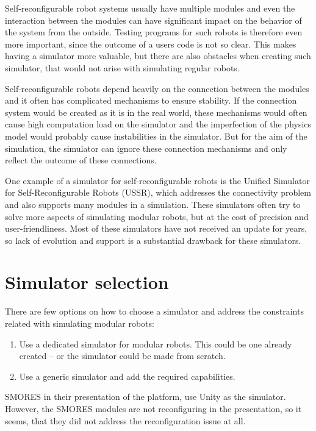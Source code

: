 \documentclass[
  digital, %
  table,   %
  oneside, %
  nolof,     %
  nolot,     %
]{fithesis3}
\begin{document}
Self-reconfigurable robot systems usually have multiple modules and even the interaction between the modules can have significant impact on the behavior of the system from the outside.
Testing programs for such robots is therefore even more important, since the outcome of a users code is not so clear.
This makes having a simulator more valuable, but there are also obstacles when creating such simulator, that would not arise with simulating regular robots.

Self-reconfigurable robots depend heavily on the connection between the modules and it often has complicated mechanisms to ensure stability.
If the connection system would be created as it is in the real world, these mechanisms would often cause high computation load on the simulator and the imperfection of the physics model would probably cause instabilities in the simulator.
But for the aim of the simulation, the simulator can ignore these connection mechanisms and only reflect the outcome of these connections.

One example of a simulator for self-reconfigurable robots is the Unified Simulator for Self-Reconfigurable Robots (USSR)\cite{ussr}, which addresses the connectivity problem and also supports many modules in a simulation.
These simulators often try to solve more aspects of simulating modular robots, but at the cost of precision and user-friendliness.
Most of these simulators have not received an update for years, so lack of evolution and support is a substantial drawback for these simulators.

\section{Simulator selection}

There are few options on how to choose a simulator and address the constraints related with simulating modular robots:
\begin{enumerate}
    \item Use a dedicated simulator for modular robots.
    This could be one already created -- or the simulator could be made from scratch.
    \item Use a generic simulator and add the required capabilities.
\end{enumerate}

SMORES\cite{smores} in their presentation of the platform\cite{smores-video}, use Unity as the simulator.
However, the SMORES modules are not reconfiguring in the presentation, so it seems, that they did not address the reconfiguration issue at all.
\end{document}
